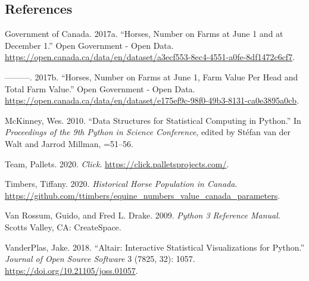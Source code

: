 \documentclass[
  letterpaper,
  DIV=11,
  numbers=noendperiod]{scrartcl}
\newlength{\cslhangindent}
\newenvironment{CSLReferences}[2] %
 {\begin{list}{}{%
  \setlength{\itemindent}{0pt}
  \setlength{\leftmargin}{0pt}
  \setlength{\parsep}{0pt}
  \ifodd #1
   \setlength{\leftmargin}{\cslhangindent}
   \setlength{\itemindent}{-1\cslhangindent}
  \fi
  \setlength{\itemsep}{#2\baselineskip}}}
 {\end{list}}
\begin{document}
\subsection*{References}\label{references}

\label{refs}
\begin{CSLReferences}{1}{0}
Government of Canada. 2017a. {``Horses, Number on Farms at June 1 and at
December 1.''} Open Government - Open Data.
\url{https://open.canada.ca/data/en/dataset/a3ecf553-8ec4-4551-a0fe-8df1472c6cf7}.

---------. 2017b. {``Horses, Number on Farms at June 1, Farm Value Per
Head and Total Farm Value.''} Open Government - Open Data.
\url{https://open.canada.ca/data/en/dataset/e175ef9c-98f0-49b3-8131-ca0e3895a0cb}.

McKinney, Wes. 2010. {``Data Structures for Statistical Computing in
Python.''} In \emph{Proceedings of the 9th Python in Science
Conference}, edited by Stéfan van der Walt and Jarrod Millman, =51--56.

Team, Pallets. 2020. \emph{Click}.
\url{https://click.palletsprojects.com/}.

Timbers, Tiffany. 2020. \emph{Historical Horse Population in Canada}.
\url{https://github.com/ttimbers/equine_numbers_value_canada_parameters}.

Van Rossum, Guido, and Fred L. Drake. 2009. \emph{Python 3 Reference
Manual}. Scotts Valley, CA: CreateSpace.

VanderPlas, Jake. 2018. {``Altair: Interactive Statistical
Visualizations for Python.''} \emph{Journal of Open Source Software} 3
(7825, 32): 1057. \url{https://doi.org/10.21105/joss.01057}.

\end{CSLReferences}
\end{document}
